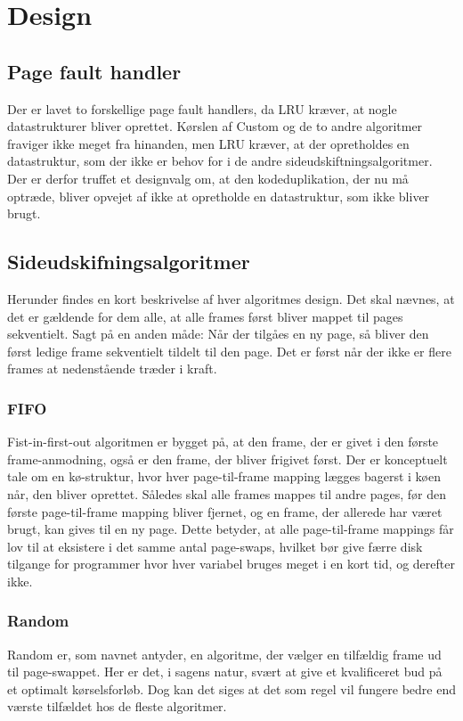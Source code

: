 \section{Design}
\label{sec:design}

\subsection{Page fault handler}
Der er lavet to forskellige page fault handlers, da LRU kræver, at nogle datastrukturer bliver oprettet. Kørslen af Custom og de to andre algoritmer fraviger ikke meget fra hinanden, men LRU kræver, at der opretholdes en datastruktur, som der ikke er behov for i de andre sideudskiftningsalgoritmer. Der er derfor truffet et designvalg om, at den kodeduplikation, der nu må optræde, bliver opvejet af ikke at opretholde en datastruktur, som ikke bliver brugt.  

\subsection{Sideudskifningsalgoritmer}
Herunder findes en kort beskrivelse af hver algoritmes design. Det skal nævnes, at det er gældende for dem alle, at alle frames først bliver mappet til pages sekventielt. Sagt på en anden måde: Når der tilgåes en ny page, så bliver den først ledige frame sekventielt tildelt til den page. Det er først når der ikke er flere frames at nedenstående træder i kraft.
	
	\subsubsection{FIFO}
	Fist-in-first-out algoritmen er bygget på, at den frame, der er givet i den første frame-anmodning, også er den frame, der bliver frigivet først. Der er konceptuelt tale om en kø-struktur, hvor hver page-til-frame mapping lægges bagerst i køen når, den bliver oprettet. Således skal alle frames mappes til andre pages, før den første page-til-frame mapping bliver fjernet, og en frame, der allerede har været brugt, kan gives til en ny page. Dette betyder, at alle page-til-frame mappings får lov til at eksistere i det samme antal page-swaps, hvilket bør give færre disk tilgange for programmer hvor hver variabel bruges meget i en kort tid, og derefter ikke.

	\subsubsection{Random}
	Random er, som navnet antyder, en algoritme, der vælger en tilfældig frame ud til page-swappet. Her er det, i sagens natur, svært at give et kvalificeret bud på et optimalt kørselsforløb. Dog kan det siges at det som regel vil fungere bedre end værste tilfældet hos de fleste algoritmer.

